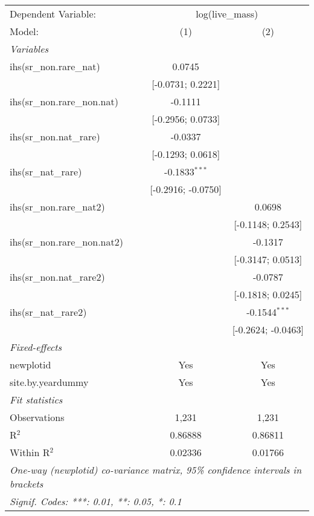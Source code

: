 \begin{tabular}{lcc}
\tabularnewline\midrule\midrule
Dependent Variable:&\multicolumn{2}{c}{log(live\_mass)}\\
Model:&(1) & (2)\\
\midrule \emph{Variables}&   &  \\
ihs(sr\_non.rare\_nat)&0.0745 &   \\
  &[-0.0731; 0.2221] &   \\
ihs(sr\_non.rare\_non.nat)&-0.1111 &   \\
  &[-0.2956; 0.0733] &   \\
ihs(sr\_non.nat\_rare)&-0.0337 &   \\
  &[-0.1293; 0.0618] &   \\
ihs(sr\_nat\_rare)&-0.1833$^{***}$ &   \\
  &[-0.2916; -0.0750] &   \\
ihs(sr\_non.rare\_nat2)&   & 0.0698\\
  &   & [-0.1148; 0.2543]\\
ihs(sr\_non.rare\_non.nat2)&   & -0.1317\\
  &   & [-0.3147; 0.0513]\\
ihs(sr\_non.nat\_rare2)&   & -0.0787\\
  &   & [-0.1818; 0.0245]\\
ihs(sr\_nat\_rare2)&   & -0.1544$^{***}$\\
  &   & [-0.2624; -0.0463]\\
\midrule \emph{Fixed-effects}&   &  \\
newplotid & Yes & Yes\\
site.by.yeardummy & Yes & Yes\\
\midrule \emph{Fit statistics}&  & \\
Observations & 1,231&1,231\\
R$^2$ & 0.86888&0.86811\\
Within R$^2$ & 0.02336&0.01766\\
\midrule\midrule\multicolumn{3}{l}{\emph{One-way (newplotid) co-variance matrix, 95\% confidence intervals in brackets}}\\
\multicolumn{3}{l}{\emph{Signif. Codes: ***: 0.01, **: 0.05, *: 0.1}}\\
\end{tabular}


